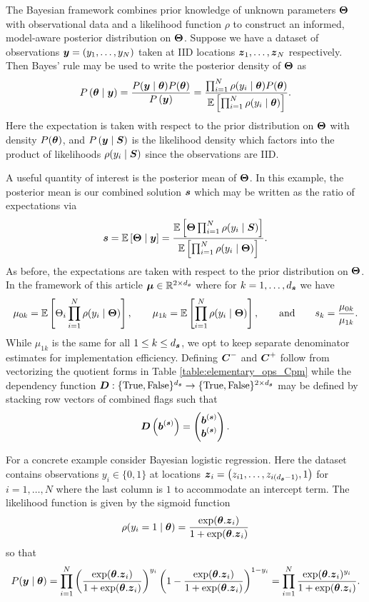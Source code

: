\documentclass{article}[12pt]
\begin{document}
The Bayesian framework combines prior knowledge of unknown parameters $\boldsymbol{\Theta}$ with observational data and a likelihood function $\rho$ to construct an informed, model-aware posterior distribution on $\boldsymbol{\Theta}$. Suppose we have a dataset of observations $\boldsymbol{y} = (y_1,\dots,y_{N})$ taken at IID locations $\boldsymbol{z}_1,\dots,\boldsymbol{z}_{N}$ respectively. Then Bayes' rule may be used to write the posterior density of $\boldsymbol{\Theta}$ as 
$$P\left(\boldsymbol{\theta} \mid \boldsymbol{y} \right) = \frac{P(\boldsymbol{y} \mid \boldsymbol{\theta}) P(\boldsymbol{\theta})}{P\left(\boldsymbol{y}\right)} = \frac{\prod_{i=1}^{N} \rho(y_i \mid \boldsymbol{\theta}) P(\boldsymbol{\theta})}{\mathbb{E}\left[\prod_{i=1}^{N} \rho(y_i \mid \boldsymbol{\theta})\right]}.$$
Here the expectation is taken with respect to the prior distribution on $\boldsymbol{\Theta}$ with density $P(\boldsymbol{\theta})$, and $P\left(\boldsymbol{y} \mid \boldsymbol{S} \right)$ is the likelihood density which factors into the product of likelihoods $\rho(y_i \mid \boldsymbol{S})$ since the observations are IID. 

A useful quantity of interest is the posterior mean of $\boldsymbol{\Theta}$. In this example, the posterior mean is our combined solution $\boldsymbol{s}$ which may be written as the ratio of expectations via
$$\boldsymbol{s} = \mathbb{E}\left[\boldsymbol{\Theta} \mid \boldsymbol{y}\right] = \frac{\mathbb{E}\left[\boldsymbol{\Theta} \prod_{i=1}^{N} \rho(y_i \mid \boldsymbol{S})\right]}{\mathbb{E}\left[\prod_{i=1}^{N} \rho(y_i \mid \boldsymbol{\Theta})\right]}.$$
As before, the expectations are taken with respect to the prior distribution on $\boldsymbol{\Theta}$. In the framework of this article $\boldsymbol{\mu} \in \mathbb{R}^{2 \times d_{\boldsymbol{s}}}$ where for $k=1,\dots,d_{\boldsymbol{s}}$ we have 
$$\mu_{0k} = \mathbb{E}\left[\Theta_i \prod_{i=1}^{N} \rho(y_i \mid \boldsymbol{\Theta})\right], \qquad \mu_{1k} = \mathbb{E}\left[\prod_{i=1}^{N} \rho(y_i \mid \boldsymbol{\Theta})\right], \qquad \text{and} \qquad s_k = \frac{\mu_{0k}}{\mu_{1k}}.$$
While $\mu_{1k}$ is the same for all $1 \leq k \leq d_{\boldsymbol{s}}$, we opt to keep separate denominator estimates for implementation efficiency. Defining $\boldsymbol{C}^-$ and $\boldsymbol{C}^+$ follow from vectorizing the quotient forms in Table \ref{table:elementary_ops_Cpm} while the dependency function $\boldsymbol{D}: \{\text{True},\text{False}\}^{d_{\boldsymbol{s}}} \to \{\text{True},\text{False}\}^{2 \times d_{\boldsymbol{s}}}$ may be defined by stacking row vectors of combined flags such that
$$\boldsymbol{D}\left(\boldsymbol{b}^{(\boldsymbol{s})}\right) = \begin{pmatrix} \boldsymbol{b}^{(\boldsymbol{s})} \\ \boldsymbol{b}^{(\boldsymbol{s})} \end{pmatrix}.$$

For a concrete example consider Bayesian logistic regression. Here the dataset contains observations $y_i \in \{0,1\}$ at locations $\boldsymbol{z}_i = \left(z_{i1},\dots,z_{i(d_{\boldsymbol{s}}-1)},1\right)$ for $i=1,\dots,N$ where the last column is $1$ to accommodate an intercept term. The likelihood function is given by the sigmoid function
$$\rho(y_i = 1 \mid \boldsymbol{\theta}) = \frac{\exp(\boldsymbol{\theta}.\boldsymbol{z}_i)}{1+\exp(\boldsymbol{\theta}.\boldsymbol{z}_i)}$$
so that
$$P(\boldsymbol{y} \mid \boldsymbol{\theta}) = \prod_{i=1}^N \left(\frac{\exp(\boldsymbol{\theta}.\boldsymbol{z}_i)}{1+\exp(\boldsymbol{\theta}.\boldsymbol{z}_i)}\right)^{y_i} \left(1-\frac{\exp(\boldsymbol{\theta}.\boldsymbol{z}_i)}{1+\exp(\boldsymbol{\theta}.\boldsymbol{z}_i)}\right)^{1-y_i} = \prod_{i=1}^N \frac{\exp(\boldsymbol{\theta}.\boldsymbol{z}_i)^{y_i}}{1+\exp(\boldsymbol{\theta}.\boldsymbol{z}_i)}.$$
\end{document}
